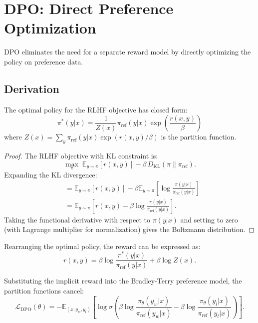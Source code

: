 \section{DPO: Direct Preference Optimization}

DPO eliminates the need for a separate reward model by directly optimizing the policy on preference data.

\subsection{Derivation}

\begin{proposition}
    The optimal policy for the RLHF objective has closed form:
    \[
        \pi^*(y|x) = \frac{1}{Z(x)} \pi_{\text{ref}}(y|x) \exp\left( \frac{r(x,y)}{\beta} \right)
    \]
    where $Z(x) = \sum_y \pi_{\text{ref}}(y|x) \exp(r(x,y)/\beta)$ is the partition function.
\end{proposition}

\begin{proof}
    The RLHF objective with KL constraint is:
    \[
        \max_\pi \; \mathbb{E}_{y \sim \pi}[r(x,y)] - \beta \, D_{\mathrm{KL}}(\pi \| \pi_{\text{ref}}).
    \]
    Expanding the KL divergence:
    \begin{align*}
         & = \mathbb{E}_{y \sim \pi}[r(x,y)] - \beta \mathbb{E}_{y \sim \pi}\left[ \log \frac{\pi(y|x)}{\pi_{\text{ref}}(y|x)} \right] \\
         & = \mathbb{E}_{y \sim \pi}\left[ r(x,y) - \beta \log \frac{\pi(y|x)}{\pi_{\text{ref}}(y|x)} \right].
    \end{align*}
    Taking the functional derivative with respect to $\pi(y|x)$ and setting to zero (with Lagrange multiplier for normalization) gives the Boltzmann distribution.
\end{proof}

\begin{corollary}
    Rearranging the optimal policy, the reward can be expressed as:
    \[
        r(x, y) = \beta \log \frac{\pi^*(y|x)}{\pi_{\text{ref}}(y|x)} + \beta \log Z(x).
    \]
\end{corollary}

\begin{theorem}
    Substituting the implicit reward into the Bradley-Terry preference model, the partition functions cancel:
    \[
        \mathcal{L}_{\text{DPO}}(\theta) = -\mathbb{E}_{(x, y_w, y_l)} \left[ \log \sigma\left( \beta \log \frac{\pi_\theta(y_w|x)}{\pi_{\text{ref}}(y_w|x)} - \beta \log \frac{\pi_\theta(y_l|x)}{\pi_{\text{ref}}(y_l|x)} \right) \right].
    \]
\end{theorem}

